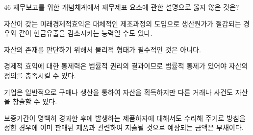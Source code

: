 \begin{question}{46}
재무보고를 위한 개념체계에서 재무제표 요소에 관한 설명으로 옳지 않은 것은?
\begin{choices}
  \item 자산이 갖는 미래경제적효익은 대체적인 제조과정의 도입으로 생산원가가 절감되는 경우와 같이 현금유출을 감소시키는 능력일 수도 있다.
  \item 자산의 존재를 판단하기 위해서 물리적 형태가 필수적인 것은 아니다.
  \item 경제적 효익에 대한 통제력은 법률적 권리의 결과이므로 법률적 통제가 있어야 자산의 정의를 충족시킬 수 있다.
  \item 기업은 일반적으로 구매나 생산을 통하여 자산을 획득하지만 다른 거래나 사건도 자산을 창출할 수 있다.
  \item 보증기간이 명백히 경과한 후에 발생하는 제품하자에 대해서도 수리해 주기로 방침을 정한 경우에 이미 판매된 제품과 관련하여 지출될 것으로 예상되는 금액은 부채이다.
\end{choices}
\end{question}
